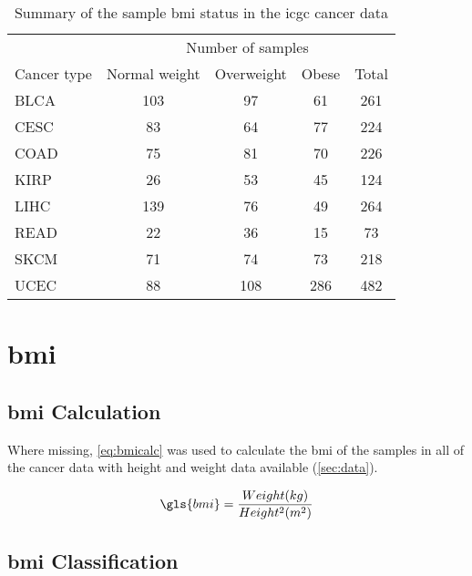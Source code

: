 \begin{table}[htpb]
	\caption{Summary of the sample \gls{bmi} status in the \gls{icgc} cancer data}
	\label{tab:icgc_bmi}
	\begin{center}
		\begin{tabular}{lcccc}
			& \multicolumn{4}{c}{Number of samples}\\
			\cmidrule(r){2-5}
			Cancer type & Normal weight & Overweight & Obese & Total\\
			\hline
			\hline
			\rule{0pt}{2.25ex}BLCA & 103 & 97  & 61  & 261 \\
			CESC                   & 83  & 64  & 77  & 224 \\
			COAD                   & 75  & 81  & 70  & 226 \\
			KIRP                   & 26  & 53  & 45  & 124 \\
			LIHC                   & 139 & 76  & 49  & 264 \\
			READ                   & 22  & 36  & 15  & 73  \\
			SKCM                   & 71  & 74  & 73  & 218 \\
			UCEC                   & 88  & 108 & 286 & 482 \\
			\hline
			\hline
		\end{tabular}
	\end{center}
\end{table}

\section{\Gls{bmi}}
\label{sec:bmi}

\subsection{\gls{bmi} Calculation}
\label{subsec:bmicalc}

Where missing, \cref{eq:bmicalc} was used to calculate the \gls{bmi} of the samples in all of the cancer data with height and weight data available (\cref{sec:data}).

\begin{equation}
	\label{eq:bmicalc}
	\gls{bmi} = \frac{Weight (kg)}{Height^2(m^2)}\\
\end{equation}

\subsection{\gls{bmi} Classification}
\label{subsec:bmiclassification}

